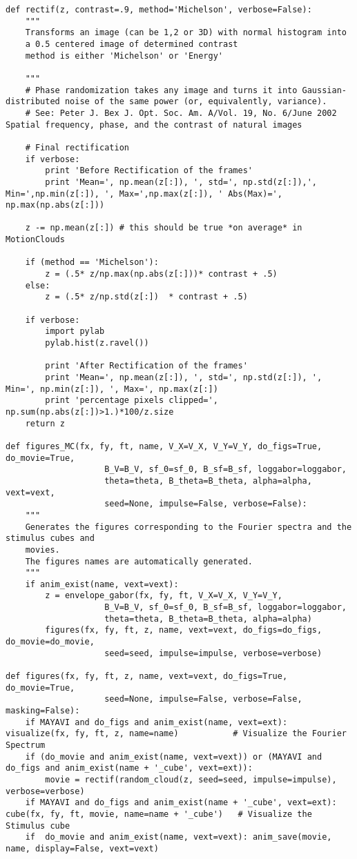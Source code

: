 \documentclass[a4paper,11pt]{article}%
\begin{document}
\begin{lstlisting}
def rectif(z, contrast=.9, method='Michelson', verbose=False):
    """ 
    Transforms an image (can be 1,2 or 3D) with normal histogram into
    a 0.5 centered image of determined contrast
    method is either 'Michelson' or 'Energy'

    """
    # Phase randomization takes any image and turns it into Gaussian-distributed noise of the same power (or, equivalently, variance).
    # See: Peter J. Bex J. Opt. Soc. Am. A/Vol. 19, No. 6/June 2002 Spatial frequency, phase, and the contrast of natural images

    # Final rectification
    if verbose:
        print 'Before Rectification of the frames'
        print 'Mean=', np.mean(z[:]), ', std=', np.std(z[:]),', Min=',np.min(z[:]), ', Max=',np.max(z[:]), ' Abs(Max)=', np.max(np.abs(z[:]))

    z -= np.mean(z[:]) # this should be true *on average* in MotionClouds

    if (method == 'Michelson'):
        z = (.5* z/np.max(np.abs(z[:]))* contrast + .5)
    else:
        z = (.5* z/np.std(z[:])  * contrast + .5)

    if verbose:
        import pylab
        pylab.hist(z.ravel())

        print 'After Rectification of the frames'
        print 'Mean=', np.mean(z[:]), ', std=', np.std(z[:]), ', Min=', np.min(z[:]), ', Max=', np.max(z[:])
        print 'percentage pixels clipped=',  np.sum(np.abs(z[:])>1.)*100/z.size
    return z

def figures_MC(fx, fy, ft, name, V_X=V_X, V_Y=V_Y, do_figs=True, do_movie=True,
                    B_V=B_V, sf_0=sf_0, B_sf=B_sf, loggabor=loggabor,
                    theta=theta, B_theta=B_theta, alpha=alpha, vext=vext,
                    seed=None, impulse=False, verbose=False):
    """
    Generates the figures corresponding to the Fourier spectra and the stimulus cubes and
    movies.
    The figures names are automatically generated.
    """
    if anim_exist(name, vext=vext):
        z = envelope_gabor(fx, fy, ft, V_X=V_X, V_Y=V_Y,
                    B_V=B_V, sf_0=sf_0, B_sf=B_sf, loggabor=loggabor,
                    theta=theta, B_theta=B_theta, alpha=alpha)
        figures(fx, fy, ft, z, name, vext=vext, do_figs=do_figs, do_movie=do_movie,
                    seed=seed, impulse=impulse, verbose=verbose)

def figures(fx, fy, ft, z, name, vext=vext, do_figs=True, do_movie=True,
                    seed=None, impulse=False, verbose=False, masking=False):
    if MAYAVI and do_figs and anim_exist(name, vext=ext): visualize(fx, fy, ft, z, name=name)           # Visualize the Fourier Spectrum
    if (do_movie and anim_exist(name, vext=vext)) or (MAYAVI and do_figs and anim_exist(name + '_cube', vext=ext)):
        movie = rectif(random_cloud(z, seed=seed, impulse=impulse), verbose=verbose)
    if MAYAVI and do_figs and anim_exist(name + '_cube', vext=ext): cube(fx, fy, ft, movie, name=name + '_cube')   # Visualize the Stimulus cube
    if  do_movie and anim_exist(name, vext=vext): anim_save(movie, name, display=False, vext=vext)
\end{lstlisting}
\end{document}
